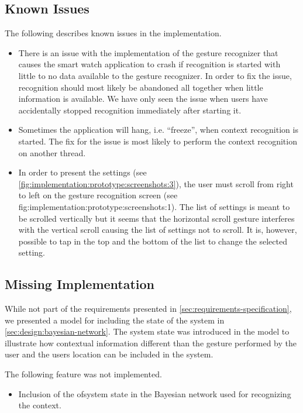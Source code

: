 \subsection{Known Issues}

The following describes known issues in the implementation.

\begin{itemize}
\item There is an issue with the implementation of the gesture recognizer that causes the smart watch application to crash if recognition is started with little to no data available to the gesture recognizer. In order to fix the issue, recognition should most likely be abandoned all together when little information is available. We have only seen the issue when users have accidentally stopped recognition immediately after starting it.
\item Sometimes the application will hang, i.e. ``freeze'', when context recognition is started. The fix for the issue is most likely to perform the context recognition on another thread.
\item In order to present the settings (see \cref{fig:implementation:prototype:screenshots:3}), the user must scroll from right to left on the gesture recognition screen (see fig:implementation:prototype:screenshots:1). The list of settings is meant to be scrolled vertically but it seems that the horizontal scroll gesture interferes with the vertical scroll causing the list of settings not to scroll. It is, however, possible to tap in the top and the bottom of the list to change the selected setting.
\end{itemize}

\subsection{Missing Implementation}

While not part of the requirements presented in \cref{sec:requirements-specification}, we presented a model for including the state of the system in \cref{sec:design:bayesian-network}. The system state was introduced in the model to illustrate how contextual information different than the gesture performed by the user and the users location can be included in the system.

The following feature was not implemented.

\begin{itemize}
\item Inclusion of the ofsystem state in the Bayesian network used for recognizing the context.
\end{itemize}

